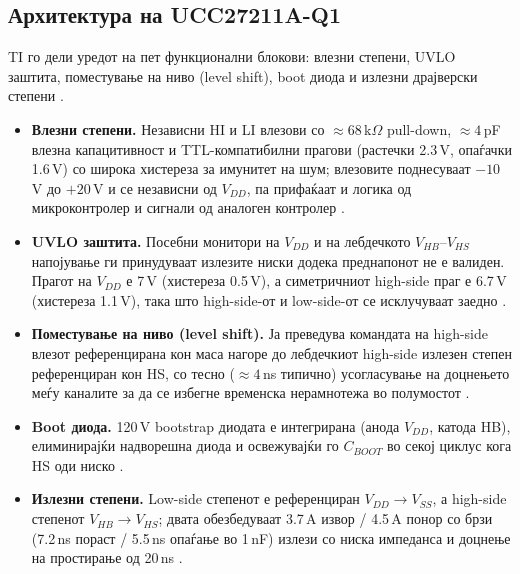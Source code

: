 \documentclass[11pt,a4paper]{article}
\newcommand{\eng}[1]{\textenglish{#1}}
\begin{document}
\subsection{Архитектура на UCC27211A-Q1}

TI го дели уредот на пет функционални блокови: влезни степени, UVLO заштита, поместување на ниво (\eng{level shift}), \eng{boot} диода и излезни драјверски степени \cite{ref3}.
\begin{itemize}
  \item \textbf{Влезни степени.} Независни HI и LI влезови со $\approx 68$\,k$\Omega$ \eng{pull-down}, $\approx 4$\,pF влезна капацитивност и TTL-компатибилни прагови (растечки 2.3\,V, опаѓачки 1.6\,V) со широка хистереза за имунитет на шум; влезовите поднесуваат $-10$\,V до $+20$\,V и се независни од $V_{DD}$, па прифаќаат и логика од микроконтролер и сигнали од аналоген контролер \cite{ref3}.
  \item \textbf{UVLO заштита.} Посебни монитори на $V_{DD}$ и на лебдечкото $V_{HB}$--$V_{HS}$ напојување ги принудуваат излезите ниски додека преднапонот не е валиден. Прагот на $V_{DD}$ е 7\,V (хистереза 0.5\,V), а симетричниот \eng{high-side} праг е 6.7\,V (хистереза 1.1\,V), така што \eng{high-side}-от и \eng{low-side}-от се исклучуваат заедно \cite{ref3}.
  \item \textbf{Поместување на ниво (\eng{level shift}).} Ја преведува командата на \eng{high-side} влезот референцирана кон маса нагоре до лебдечкиот \eng{high-side} излезен степен референциран кон HS, со тесно ($\approx 4$\,ns типично) усогласување на доцнењето меѓу каналите за да се избегне временска нерамнотежа во полумостот \cite{ref3}.
  \item \textbf{\eng{Boot} диода.} 120\,V \eng{bootstrap} диодата е интегрирана (анода $V_{DD}$, катода HB), елиминирајќи надворешна диода и освежувајќи го $C_{BOOT}$ во секој циклус кога HS оди ниско \cite{ref3}.
  \item \textbf{Излезни степени.} \eng{Low-side} степенот е референциран $V_{DD}\rightarrow V_{SS}$, а \eng{high-side} степенот $V_{HB}\rightarrow V_{HS}$; двата обезбедуваат 3.7\,A извор / 4.5\,A понор со брзи (7.2\,ns пораст / 5.5\,ns опаѓање во 1\,nF) излези со ниска импеданса и доцнење на простирање од 20\,ns \cite{ref3}.
\end{itemize}
\end{document}
